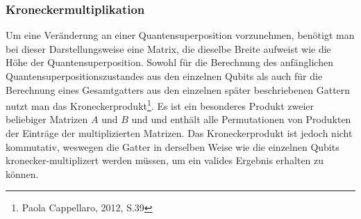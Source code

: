 \documentclass[12pt]{report}
\begin{document}
\subsubsection{Kroneckermultiplikation}						%
Um eine Veränderung an einer Quantensuperposition vorzunehmen, benötigt man bei dieser Darstellungsweise eine Matrix, die dieselbe Breite aufweist wie die Höhe der Quantensuperposition. Sowohl für die Berechnung des anfänglichen Quantensuperpositionszustandes aus den einzelnen Qubits als auch für die Berechnung eines Gesamtgatters aus den einzelnen später beschriebenen Gattern nutzt man das Kroneckerprodukt\footnote{Paola Cappellaro, 2012, S.39}.
Es ist ein besonderes Produkt zweier beliebiger Matrizen $A$ und $B$ und und enthält alle Permutationen von Produkten der Einträge der multiplizierten Matrizen. Das Kroneckerprodukt ist jedoch nicht kommutativ, weswegen die Gatter in derselben Weise wie die einzelnen Qubits kronecker-multiplizert werden müssen, um ein valides Ergebnis erhalten zu können.
\end{document}
